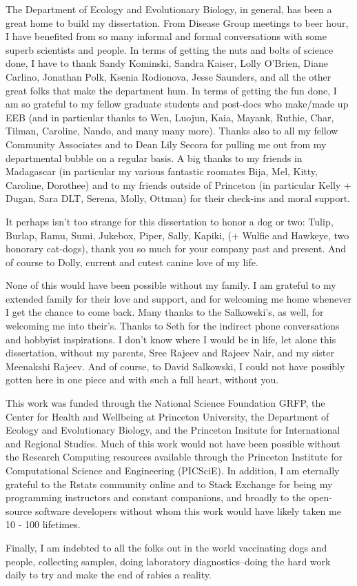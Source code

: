 The Department of Ecology and Evolutionary Biology, in general, has been a great home to build my dissertation. From Disease Group meetings to beer hour, I have benefited from so many informal and formal conversations with some superb scientists and people. In terms of getting the nuts and bolts of science done, I have to thank Sandy Kominski, Sandra Kaiser, Lolly O'Brien, Diane Carlino, Jonathan Polk, Ksenia Rodionova, Jesse Saunders, and all the other great folks that make the department hum. In terms of getting the fun done, I am so grateful to my fellow graduate students and post-docs who make/made up EEB (and in particular thanks to Wen, Luojun, Kaia, Mayank, Ruthie, Char, Tilman, Caroline, Nando, and many many more). Thanks also to all my fellow Community Associates and to Dean Lily Secora for pulling me out from my departmental bubble on a regular basis. A big thanks to my friends in Madagascar (in particular my various fantastic roomates Bija, Mel, Kitty, Caroline, Dorothee) and to my friends outside of Princeton (in particular Kelly + Dugan, Sara DLT, Serena, Molly, Ottman) for their check-ins and moral support.

It perhaps isn't too strange for this dissertation to honor a dog or two: Tulip, Burlap, Ramu, Sumi, Jukebox, Piper, Sally, Kapiki, (+ Wulfie and Hawkeye, two honorary cat-dogs), thank you so much for your company past and present. And of course to Dolly, current and cutest canine love of my life. 

None of this would have been possible without my family. I am grateful to my extended family for their love and support, and for welcoming me home whenever I get the chance to come back. Many thanks to the Salkowski's, as well, for welcoming me into their's. Thanks to Seth for the indirect phone conversations and hobbyist inspirations. I don't know where I would be in life, let alone this dissertation, without my parents, Sree Rajeev and Rajeev Nair, and my sister Meenakshi Rajeev. And of course, to David Salkowski, I could not have possibly gotten here in one piece and with such a full heart, without you. 

This work was funded through the National Science Foundation GRFP, the Center for Health and Wellbeing at Princeton University, the Department of Ecology and Evolutionary Biology, and the Princeton Insitute for International and Regional Studies. Much of this work would not have been possible without the Research Computing resources available through the Princeton Institute for Computational Science and Engineering (PICSciE). In addition, I am eternally grateful to the Rstats community online and to Stack Exchange for being my programming instructors and constant companions, and broadly to the open-source software developers without whom this work would have likely taken me 10 - 100 lifetimes.

Finally, I am indebted to all the folks out in the world vaccinating dogs and people, collecting samples, doing laboratory diagnostics--doing the hard work daily to try and make the end of rabies a reality. 
